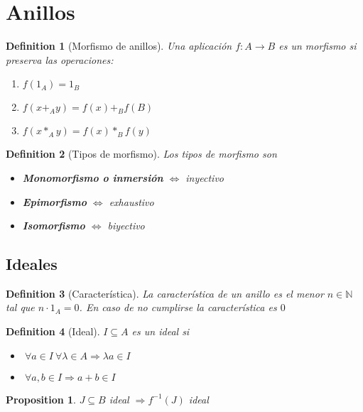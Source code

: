 \documentclass[leqno]{article}
\newtheorem*{proposition}{Proposition}
\newtheorem*{definition}{Definition}
\begin{document}
\section{Anillos}

\begin{definition}[Morfismo de anillos] Una aplicación $f:A \to B$ es un morfismo si preserva las operaciones:
\begin{enumerate}[topsep=-6pt, itemsep=0pt]
  \item $f(1_A) = 1_B$ 
  \item $f(x+_A y)= f(x)+_B f(B)$ 
  \item $f(x*_Ay)=f(x)*_Bf(y)$
\end{enumerate}
\end{definition}

\begin{definition}[Tipos de morfismo] Los tipos de morfismo son
\begin{itemize}[topsep=-6pt, itemsep=0pt]
  \item \textbf{Monomorfismo o inmersión} $\iff $ inyectivo 
  \item \textbf{Epimorfismo} $\iff$ exhaustivo
  \item \textbf{Isomorfismo} $\iff$ biyectivo
\end{itemize}
\end{definition}


\subsection{Ideales}

\begin{definition}[Característica] La característica de un anillo es el menor $n\in \mathbb{N} $ tal que $n \cdot 1_A = 0$. En caso de no cumplirse la característica es $0$
\end{definition}

\begin{definition}[Ideal] $I\subseteq A$ es un ideal si
\begin{itemize}[topsep=-6pt, itemsep=0pt]
  \item $\ \forall a \in I \ \forall \lambda \in A \Rightarrow \lambda a \in I$
  \item $\ \forall a, b \in I \Rightarrow a+b \in I$
\end{itemize}
\end{definition}

\begin{proposition}
$J\subseteq B$ ideal $\Rightarrow f^{-1}(J)$ ideal 
\end{proposition}
\end{document}

